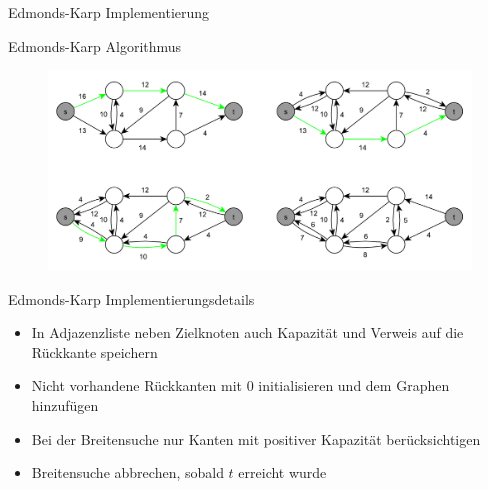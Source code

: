 \documentclass[18pt]{beamer}
\begin{document}
\begin{frame}{Edmonds-Karp Implementierung}
\SetEndCharOfAlgoLine{}
\begin{algorithm}[H]
	\caption{Edmonds-Karp}
\end{algorithm}
\end{frame}

\begin{frame}{Edmonds-Karp Algorithmus}
\begin{figure}
	\includegraphics[width = \textwidth]{img/Jakob_Edmond.pdf}
\end{figure}
\end{frame}

\begin{frame}{Edmonds-Karp Implementierungsdetails}
\begin{itemize}
	\item In Adjazenzliste neben Zielknoten auch Kapazit\"at und Verweis auf die R\"uckkante speichern
	\item Nicht vorhandene R\"uckkanten mit 0 initialisieren und dem Graphen hinzuf\"ugen
	\item Bei der Breitensuche nur Kanten mit positiver Kapazit\"at ber\"ucksichtigen
	\item Breitensuche abbrechen, sobald $t$ erreicht wurde
\end{itemize}
\end{frame}
\end{document}
